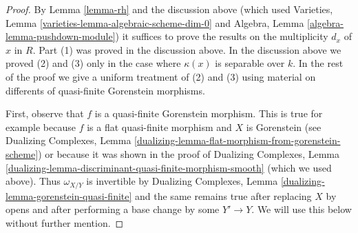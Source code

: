 \begin{proof}
By Lemma \ref{lemma-rh} and the discussion above
(which used
Varieties, Lemma \ref{varieties-lemma-algebraic-scheme-dim-0}
and
Algebra, Lemma \ref{algebra-lemma-pushdown-module})
it suffices to prove the results on the
multiplicity $d_x$ of $x$ in $R$. Part (1) was proved
in the discussion above. In the discussion above
we proved (2) and (3) only in the case where $\kappa(x)$ is
separable over $k$.
In the rest of the proof we give a uniform treatment
of (2) and (3) using material on differents of
quasi-finite Gorenstein morphisms.

\medskip\noindent
First, observe that $f$ is a quasi-finite Gorenstein morphism.
This is true for example because
$f$ is a flat quasi-finite morphism and $X$ is Gorenstein
(see Dualizing Complexes, Lemma
\ref{dualizing-lemma-flat-morphism-from-gorenstein-scheme})
or because it was shown in the proof of
Dualizing Complexes, Lemma
\ref{dualizing-lemma-discriminant-quasi-finite-morphism-smooth}
(which we used above). Thus $\omega_{X/Y}$ is invertible by
Dualizing Complexes, Lemma \ref{dualizing-lemma-gorenstein-quasi-finite}
and the same remains true after replacing $X$ by opens and after
performing a base change by some $Y' \to Y$. We will use this
below without further mention.


\end{proof}
